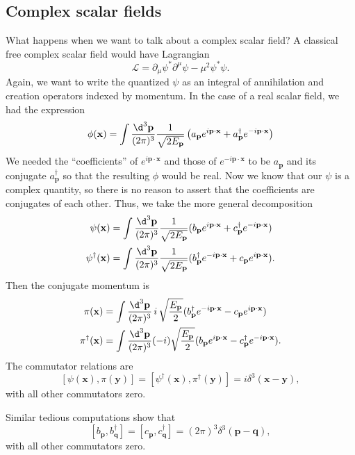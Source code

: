 \documentclass[a4paper]{article}
\begin{document}
\subsection{Complex scalar fields}
What happens when we want to talk about a complex scalar field? A classical free complex scalar field would have Lagrangian
\[
  \mathcal{L} = \partial_\mu \psi^* \partial^\mu \psi - \mu^2 \psi^* \psi.
\]
Again, we want to write the quantized $\psi$ as an integral of annihilation and creation operators indexed by momentum. In the case of a real scalar field, we had the expression
\[
  \phi(\mathbf{x}) = \int \frac{\d^3 \mathbf{p}}{(2\pi)^3} \frac{1}{\sqrt{2 E_\mathbf{p}}} \left(a_\mathbf{p} e^{i \mathbf{p} \cdot \mathbf{x}} + a_\mathbf{p}^\dagger e^{-i \mathbf{p}\cdot \mathbf{x}}\right)
\]
We needed the ``coefficients'' of $e^{i\mathbf{p}\cdot \mathbf{x}}$ and those of $e^{-i\mathbf{p}\cdot \mathbf{x}}$ to be $a_\mathbf{p}$ and its conjugate $a_\mathbf{p}^\dagger$ so that the resulting $\phi$ would be real. Now we know that our $\psi$ is a complex quantity, so there is no reason to assert that the coefficients are conjugates of each other. Thus, we take the more general decomposition
\begin{align*}
  \psi(\mathbf{x}) &= \int \frac{\d^3 \mathbf{p}}{(2\pi)^3}\frac{1}{\sqrt{2 E_\mathbf{p}}}(b_\mathbf{p} e^{i \mathbf{p}\cdot \mathbf{x}} + c_\mathbf{p}^\dagger e^{-i\mathbf{p}\cdot \mathbf{x}})\\
  \psi^\dagger(\mathbf{x}) &= \int \frac{\d^3 \mathbf{p}}{(2\pi)^3} \frac{1}{\sqrt{2E_\mathbf{p}}} (b_\mathbf{p}^\dagger e^{-i\mathbf{p}\cdot \mathbf{x}} + c_\mathbf{p} e^{i\mathbf{p}\cdot \mathbf{x}}).
\end{align*}
Then the conjugate momentum is
\begin{align*}
  \pi(\mathbf{x}) &= \int \frac{\d^3 \mathbf{p}}{(2\pi)^3} \, i \, \sqrt{\frac{E_\mathbf{p}}{2}} (b_\mathbf{p}^\dagger e^{-i\mathbf{p}\cdot \mathbf{x}} - c_\mathbf{p}e^{i\mathbf{p}\cdot \mathbf{x}})\\
  \pi^\dagger(\mathbf{x}) &= \int \frac{\d^3 \mathbf{p}}{(2\pi)^3}(-i) \sqrt{\frac{E_\mathbf{p}}{2}} (b_\mathbf{p} e^{i\mathbf{p}\cdot \mathbf{x}} - c_\mathbf{p}^\dagger e^{-i\mathbf{p}\cdot \mathbf{x}}).
\end{align*}
The commutator relations are
\[
  [\psi(\mathbf{x}), \pi(\mathbf{y})] = [\psi^\dagger(\mathbf{x}), \pi^\dagger(\mathbf{y})] = i \delta^3(\mathbf{x} - \mathbf{y}),
\]
with all other commutators zero.

Similar tedious computations show that
\[
  [b_\mathbf{p}, b_\mathbf{q}^\dagger] = [c_\mathbf{p}, c_\mathbf{q}^\dagger] = (2\pi)^3 \delta^3(\mathbf{p} - \mathbf{q}),
\]
with all other commutators zero.
\end{document}
